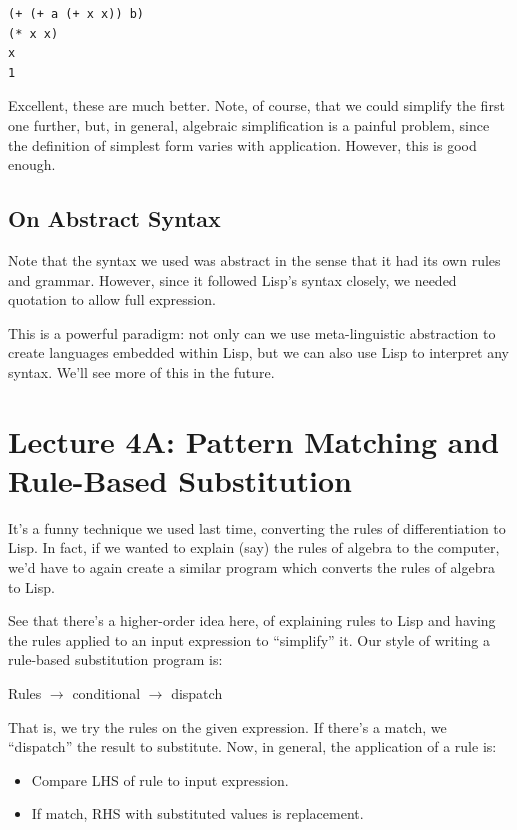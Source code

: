 \documentclass[9pt]{report}
\begin{document}
\begin{verbatim}
(+ (+ a (+ x x)) b)
(* x x)
x
1
\end{verbatim}


Excellent, these are much better. Note, of course, that we could
simplify the first one further, but, in general, algebraic
simplification is a painful problem, since the definition of
simplest form varies with application. However, this is good
enough.

\section{On Abstract Syntax}
\label{sec:org35b2d0f}

Note that the syntax we used was abstract in the sense that it had
its own rules and grammar. However, since it followed Lisp's syntax
closely, we needed quotation to allow full expression.

This is a powerful paradigm: not only can we use meta-linguistic
abstraction to create languages embedded within Lisp, but we can
also use Lisp to interpret any syntax. We'll see more of this in
the future.

\chapter{Lecture 4A: Pattern Matching and Rule-Based Substitution}
\label{sec:org9b0391a}

It's a funny technique we used last time, converting the rules of
differentiation to Lisp. In fact, if we wanted to explain (say) the
rules of algebra to the computer, we'd have to again create a
similar program which converts the rules of algebra to Lisp.

See that there's a higher-order idea here, of explaining rules to
Lisp and having the rules applied to an input expression to
``simplify'' it. Our style of writing a rule-based substitution
program is:

Rules \(\rightarrow\) conditional \(\rightarrow\) dispatch

That is, we try the rules on the given expression. If there's a
match, we ``dispatch'' the result to substitute. Now, in general, the
application of a rule is:

\begin{itemize}
\item Compare LHS of rule to input expression.
\item If match, RHS with substituted values is replacement.
\end{itemize}
\end{document}
